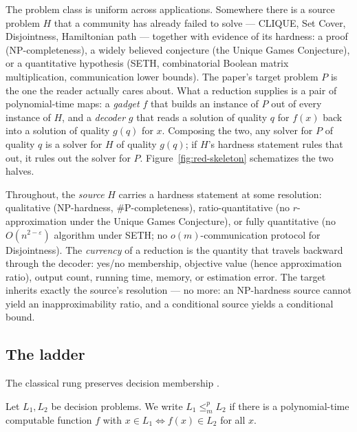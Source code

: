 The problem class is uniform across applications. Somewhere there is a source problem
$H$ that a community has already failed to solve --- CLIQUE, Set Cover, Disjointness,
Hamiltonian path --- together with evidence of its hardness: a proof (NP-completeness),
a widely believed conjecture (the Unique Games Conjecture), or a quantitative hypothesis
(SETH, combinatorial Boolean matrix multiplication, communication lower bounds). The
paper's target problem $P$ is the one the reader actually cares about. What a reduction
supplies is a pair of polynomial-time maps: a \emph{gadget} $f$ that builds an instance
of $P$ out of every instance of $H$, and a \emph{decoder} $g$ that reads a solution of
quality $q$ for $f(x)$ back into a solution of quality $g(q)$ for $x$. Composing the
two, any solver for $P$ of quality $q$ is a solver for $H$ of quality $g(q)$; if $H$'s
hardness statement rules that out, it rules out the solver for $P$.
Figure~\ref{fig:red-skeleton} schematizes the two halves.

\begin{remarkbox}
Throughout, the \emph{source} $H$ carries a hardness statement at some resolution:
qualitative (NP-hardness, \#P-completeness), ratio-quantitative (no $r$-approximation
under the Unique Games Conjecture), or fully quantitative (no $O(n^{2-\varepsilon})$
algorithm under SETH; no $o(m)$-communication protocol for Disjointness). The
\emph{currency} of a reduction is the quantity that travels backward through the
decoder: yes/no membership, objective value (hence approximation ratio), output count,
running time, memory, or estimation error. The target inherits exactly the source's
resolution --- no more: an NP-hardness source cannot yield an inapproximability ratio,
and a conditional source yields a conditional bound.
\end{remarkbox}

\subsection{The ladder}
\label{sec:red-ladder}

The classical rung preserves decision membership
\citep{reduction-bg2,reduction-bg1,reduction-bg3}.

\begin{definition}\label{def:red-manyone}
Let $L_1, L_2$ be decision problems. We write $L_1 \le_m^p L_2$ if there is a
polynomial-time computable function $f$ with $x \in L_1 \iff f(x) \in L_2$ for all $x$.
\eop
\end{definition}

